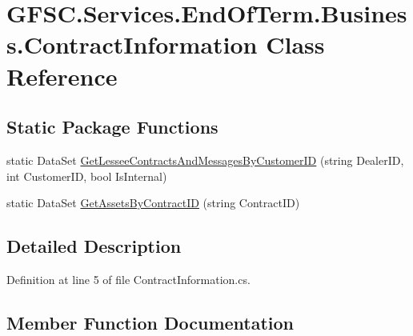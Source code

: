 \hypertarget{class_g_f_s_c_1_1_services_1_1_end_of_term_1_1_business_1_1_contract_information}{}\section{G\+F\+S\+C.\+Services.\+End\+Of\+Term.\+Business.\+Contract\+Information Class Reference}
\label{class_g_f_s_c_1_1_services_1_1_end_of_term_1_1_business_1_1_contract_information}
\subsection*{Static Package Functions}
\begin{DoxyCompactItemize}
\item 
static Data\+Set \mbox{\hyperlink{class_g_f_s_c_1_1_services_1_1_end_of_term_1_1_business_1_1_contract_information_a714358e96fe7331e1c5ed90a79f4afbb}{Get\+Lessee\+Contracts\+And\+Messages\+By\+Customer\+ID}} (string Dealer\+ID, int Customer\+ID, bool Is\+Internal)
\item 
static Data\+Set \mbox{\hyperlink{class_g_f_s_c_1_1_services_1_1_end_of_term_1_1_business_1_1_contract_information_aa405f382dd5f4c2f5e1d308196ceaed7}{Get\+Assets\+By\+Contract\+ID}} (string Contract\+ID)
\end{DoxyCompactItemize}


\subsection{Detailed Description}


Definition at line 5 of file Contract\+Information.\+cs.



\subsection{Member Function Documentation}
\mbox{\label{class_g_f_s_c_1_1_services_1_1_end_of_term_1_1_business_1_1_contract_information_aa405f382dd5f4c2f5e1d308196ceaed7}} 
